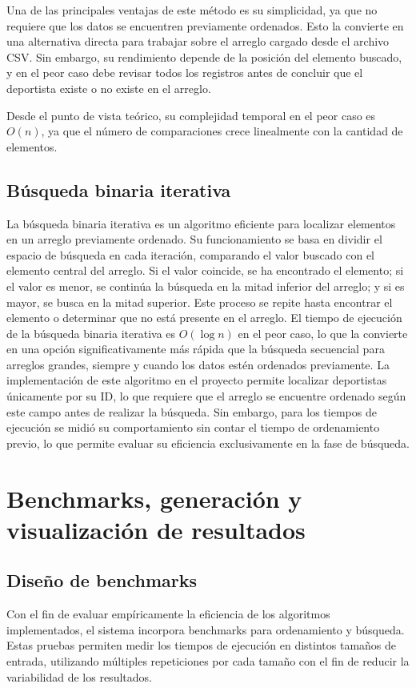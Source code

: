 Una de las principales ventajas de este método es su simplicidad, ya que no requiere que los datos se encuentren previamente ordenados. Esto la convierte en una alternativa directa para trabajar sobre el arreglo cargado desde el archivo CSV. Sin embargo, su rendimiento depende de la posición del elemento buscado, y en el peor caso debe revisar todos los registros antes de concluir que el deportista existe o no existe en el arreglo.

Desde el punto de vista teórico, su complejidad temporal en el peor caso es \(O(n)\), ya que el número de comparaciones crece linealmente con la cantidad de elementos.

\subsection{Búsqueda binaria iterativa}
La búsqueda binaria iterativa es un algoritmo eficiente para localizar elementos en un arreglo previamente ordenado. Su funcionamiento se basa en dividir el espacio de búsqueda en cada iteración, comparando el valor buscado con el elemento central del arreglo. Si el valor coincide, se ha encontrado el elemento; si el valor es menor, se continúa la búsqueda en la mitad inferior del arreglo; y si es mayor, se busca en la mitad superior. Este proceso se repite hasta encontrar el elemento o determinar que no está presente en el arreglo. El tiempo de ejecución de la búsqueda binaria iterativa es \(O(\log n)\) en el peor caso, lo que la convierte en una opción significativamente más rápida que la búsqueda secuencial para arreglos grandes, siempre y cuando los datos estén ordenados previamente. La implementación de este algoritmo en el proyecto permite localizar deportistas únicamente por su ID, lo que requiere que el arreglo se encuentre ordenado según este campo antes de realizar la búsqueda. Sin embargo, para los tiempos de ejecución se midió su comportamiento sin contar el tiempo de ordenamiento previo, lo que permite evaluar su eficiencia exclusivamente en la fase de búsqueda.

\section{Benchmarks, generación y visualización de resultados}
\subsection{Diseño de benchmarks}
Con el fin de evaluar empíricamente la eficiencia de los algoritmos implementados, el sistema incorpora benchmarks para ordenamiento y búsqueda. Estas pruebas permiten medir los tiempos de ejecución en distintos tamaños de entrada, utilizando múltiples repeticiones por cada tamaño con el fin de reducir la variabilidad de los resultados.

